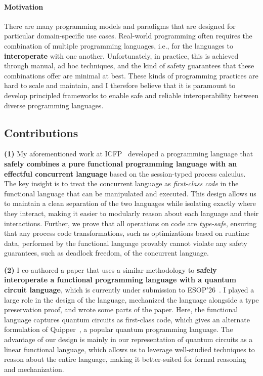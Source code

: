 \documentclass[11pt]{article}
\begin{document}
\paragraph{Motivation}
There are many programming models and paradigms that are designed for
particular domain-specific use cases.
Real-world programming often requires the combination of multiple programming languages, i.e., for the languages to \textbf{interoperate} with one another.
Unfortunately, in practice, this is achieved through manual, ad hoc techniques,
and the kind of safety guarantees that these combinations offer are
minimal at best.
These kinds of programming practices are hard to scale and maintain, and I therefore
believe that it is paramount to develop principled frameworks to enable safe and reliable interoperability between diverse programming languages.

\subsection*{Contributions}
\hspace{\parindent}\ignorespaces\textbf{(1)} My aforementioned work at ICFP~\cite{Sano25icfp} developed a programming language that \textbf{safely combines a pure functional programming language with an effectful concurrent language} based on the session-typed process calculus.
The key insight is to treat the concurrent language as \emph{first-class code} in the functional language that can be manipulated and executed.
This design allows us to maintain a clean separation of the two languages while isolating exactly where they interact, making it easier to modularly reason about each language and their interactions.
Further, we prove that all operations on code are \emph{type-safe}, ensuring that any process code transformations, such as optimizations based on runtime data, performed by the functional language provably cannot violate any safety guarantees, such as deadlock freedom, of the concurrent language.

\textbf{(2)} I co-authored a paper that uses a similar methodology to \textbf{safely interoperate a functional programming language with a quantum circuit language}, which is currently under submission to ESOP'26~\cite{Kavanagh25arxiv}.
I played a large role in the design of the language, mechanized the language alongside a type preservation proof, and wrote some parts of the paper.
Here, the functional language captures quantum circuits as first-class code, which gives an alternate formulation of Quipper~\cite{Green13pldi}, a popular quantum programming language.
The advantage of our design is mainly in our representation of quantum circuits as a linear functional language, which allows us to leverage well-studied techniques to reason about the entire language, making it better-suited for formal reasoning and mechanization.
\end{document}
